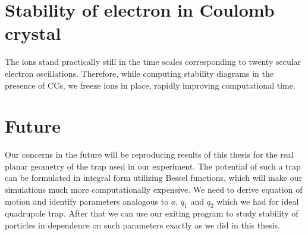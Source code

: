 \section{Stability of electron in Coulomb crystal}

The ions stand practically still in the time scales corresponding to twenty secular electron oscillations. Therefore, while computing stability diagrams in the presence of CCs, we freeze ions in place, rapidly improving computational time.


\section{Future}

Our concerns in the future will be reproducing results of this thesis for the real planar geometry of the trap used in our experiment. The potential of such a trap can be formulated in integral form utilizing Bessel functions, which will make our simulations much more computationally expensive. We need to derive equation of motion and identify parameters analogous to $a$, $q_1$ and $q_2$ which we had for ideal quadrupole trap. After that we can use our exiting program to study stability of particles in dependence on such parameters exactly as we did in this thesis. 